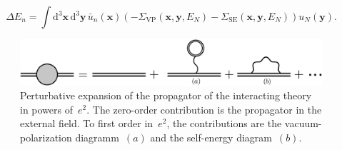 \begin{equation}
\Delta E_n = \int \text{d}^3\mathbf{x}\,\text{d}^3\mathbf{y}\,\bar{u}_n(\mathbf{x})\left( -\Sigma_{\text{VP}}(\mathbf{x},\mathbf{y},E_N)-\Sigma_{\text{SE}}(\mathbf{x},\mathbf{y},E_N) \right)u_N(\mathbf{y}).
\end{equation}
%
\begin{figure}%
\centering
\includegraphics[width=0.9\linewidth]{pics/1loop.pdf}%
\caption{Perturbative expansion of the propagator of the interacting theory in powers of~$e^2$. The zero-order contribution is the propagator in the external field. To first order in~$e^2$, the contributions are the vacuum-polarization diagramm~$(a)$ and the self-energy diagram~$(b)$.}%
\label{fig:1loop}%
\end{figure}
%

